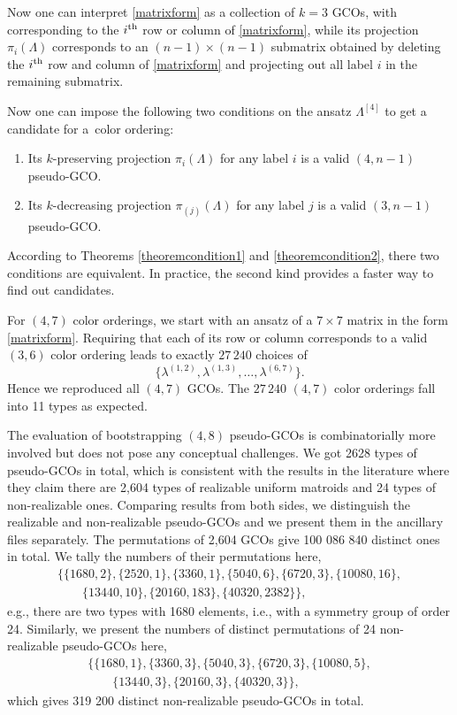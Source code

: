\documentclass[pdftex]{sigma}
\theoremstyle{definition}
\numberwithin{equation}{section}
\begin{document}
Now one can interpret \eqref{matrixform} as a collection of $k=3$ GCOs, with  corresponding to the $i^{\rm th}$ row or column of
\eqref{matrixform}, while its projection $\pi_i\left(\Lambda \right)$ corresponds to an $(n-1)\times (n-1)$ submatrix obtained by deleting the $i^{\rm th}$ row and column of \eqref{matrixform} and projecting out all label $i$ in the remaining submatrix.

Now one can impose the following two conditions on the ansatz $\Lambda ^{[4]}$ to get a candidate for a~color ordering:
\begin{enumerate}\itemsep=0pt
 \item[(a)] Its $k$-preserving projection $\pi_i\left(\Lambda\right) $
 for any label $i$
is a valid $(4,n-1)$ pseudo-GCO.
 \item[(b)] Its $k$-decreasing projection $\pi_{(j)}(\Lambda) $ for any label $j$
is a valid $(3,n-1)$ pseudo-GCO.
\end{enumerate}

According to Theorems \ref{theoremcondition1}
 and \ref{theoremcondition2}, there two conditions are equivalent. In practice, the second kind provides a faster way to find out candidates.



For $(4,7)$ color orderings, we start with an ansatz of a $7\times 7$ matrix in the form \eqref{matrixform}.
Requiring that each of its row or column corresponds to a valid $(3,6)$ color ordering leads to exactly $27\, 240$ choices of
\[
\big\{\lambda^{(1,2)},\lambda^{(1,3)},\dots, \lambda^{(6,7)}\big\}.
\]
 Hence we reproduced all $(4,7)$ GCOs. The $27\, 240$ $(4,7)$ color orderings fall into 11 types as expected.

The evaluation of
bootstrapping $(4,8)$ pseudo-GCOs is
combinatorially more involved but does not pose any conceptual challenges. We got 2628 types of pseudo-GCOs in total, which is consistent with the results in the literature \cite{fukuda2013complete} where they claim there are 2,604 types of realizable uniform matroids and 24 types of non-realizable ones.
Comparing results from both sides, we distinguish the realizable and non-realizable pseudo-GCOs and we present them in the ancillary files separately.
The
permutations of 2,604 GCOs give 100 086 840 distinct ones in total. We tally the numbers of their permutations here,
 \begin{gather*}
\{\{1680, 2\}, \{2520, 1\}, \{3360, 1\}, \{5040, 6\}, \{6720, 3\}, \{10080, 16\},\\ \qquad \{13440, 10\}, \{20160, 183\}, \{40320, 2382\}\},
\end{gather*}
 e.g., there are
two types with 1680 elements, i.e., with a symmetry group of order 24. Similarly, we present the numbers of distinct permutations of 24 non-realizable pseudo-GCOs here,
 \begin{gather*}
 \{ \{1680, 1\}, \{3360, 3\}, \{5040, 3\}, \{6720, 3\}, \{10080, 5\},\\
 \qquad \{13440, 3\},
\{20160, 3\}, \{40320, 3\} \} ,
\end{gather*}
which gives 319 200 distinct non-realizable pseudo-GCOs in total.
\end{document}
